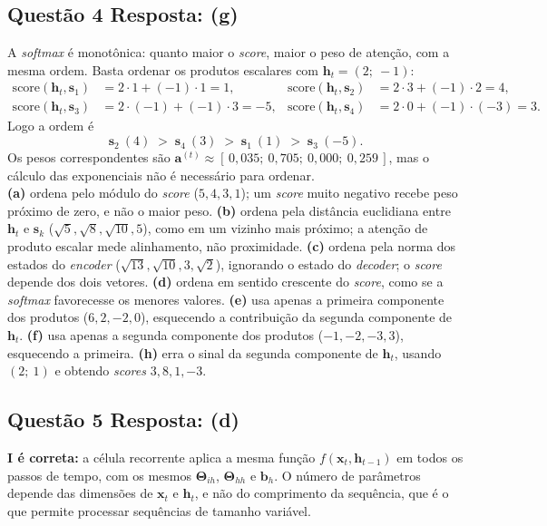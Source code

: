 \documentclass[11pt,a4paper]{article}
\begin{document}
\subsection*{Questão 4 \textemdash{} Resposta: (g)}
A \textit{softmax} é monotônica: quanto maior o \textit{score}, maior o peso de atenção, com a mesma ordem. Basta ordenar os produtos escalares com $\mathbf{h}_t = (2;\ {-}1)$:
\begin{align*}
\mathrm{score}(\mathbf{h}_t, \mathbf{s}_1) &= 2 \cdot 1 + ({-}1) \cdot 1 = 1, &
\mathrm{score}(\mathbf{h}_t, \mathbf{s}_2) &= 2 \cdot 3 + ({-}1) \cdot 2 = 4, \\
\mathrm{score}(\mathbf{h}_t, \mathbf{s}_3) &= 2 \cdot ({-}1) + ({-}1) \cdot 3 = -5, &
\mathrm{score}(\mathbf{h}_t, \mathbf{s}_4) &= 2 \cdot 0 + ({-}1) \cdot ({-}3) = 3.
\end{align*}
Logo a ordem é
\[
\mathbf{s}_2\ (4) \;>\; \mathbf{s}_4\ (3) \;>\; \mathbf{s}_1\ (1) \;>\; \mathbf{s}_3\ ({-}5).
\]
Os pesos correspondentes são $\mathbf{a}^{(t)} \approx [\,0{,}035;\ 0{,}705;\ 0{,}000;\ 0{,}259\,]$, mas o cálculo das exponenciais não é necessário para ordenar.\\
\textbf{(a)} ordena pelo módulo do \textit{score} ($5, 4, 3, 1$); um \textit{score} muito negativo recebe peso próximo de zero, e não o maior peso.
\textbf{(b)} ordena pela distância euclidiana entre $\mathbf{h}_t$ e $\mathbf{s}_k$ ($\sqrt{5}, \sqrt{8}, \sqrt{10}, 5$), como em um vizinho mais próximo; a atenção de produto escalar mede alinhamento, não proximidade.
\textbf{(c)} ordena pela norma dos estados do \textit{encoder} ($\sqrt{13}, \sqrt{10}, 3, \sqrt{2}$), ignorando o estado do \textit{decoder}; o \textit{score} depende dos dois vetores.
\textbf{(d)} ordena em sentido crescente do \textit{score}, como se a \textit{softmax} favorecesse os menores valores.
\textbf{(e)} usa apenas a primeira componente dos produtos ($6, 2, {-}2, 0$), esquecendo a contribuição da segunda componente de $\mathbf{h}_t$.
\textbf{(f)} usa apenas a segunda componente dos produtos ($-1, {-}2, {-}3, 3$), esquecendo a primeira.
\textbf{(h)} erra o sinal da segunda componente de $\mathbf{h}_t$, usando $(2;\ 1)$ e obtendo \textit{scores} $3, 8, 1, {-}3$.

\subsection*{Questão 5 \textemdash{} Resposta: (d)}
\textbf{I é correta:} a célula recorrente aplica a mesma função $f(\mathbf{x}_t, \mathbf{h}_{t-1})$ em todos os passos de tempo, com os mesmos $\mathbf{\Theta}_{ih}$, $\mathbf{\Theta}_{hh}$ e $\mathbf{b}_h$. O número de parâmetros depende das dimensões de $\mathbf{x}_t$ e $\mathbf{h}_t$, e não do comprimento da sequência, que é o que permite processar sequências de tamanho variável.
\end{document}
